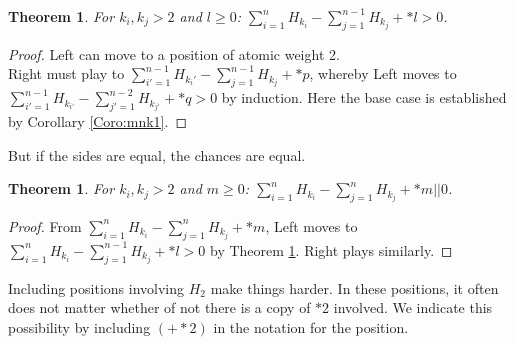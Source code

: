 \documentclass{amsart}
\newcommand{\ds}{\displaystyle}
\newtheorem{theorem}[definition]{Theorem}
\begin{document}
\begin{theorem}
\label{Thm:oneupandstar}
For $k_i,k_j>2$ and $l\geq 0$:
$\ds \sum_{i=1}^n H_{k_i}-\sum_{j=1}^{n-1}H_{k_j}+*l>0$.
\end{theorem}
\begin{proof}
Left can move to a position of atomic weight 2.\\
Right must play to $\ds \sum_{i'=1}^{n-1} H_{k_i'}-\sum_{j=1}^{n-1}H_{k_j}+*p$, whereby Left moves to $\ds \sum_{i'=1}^{n-1} H_{k_{i'}}-\sum_{j'=1}^{n-2}H_{k_{j'}}+*q>0$ by induction.  Here the base case is established by Corollary \ref{Coro:mnk1}.
\end{proof}

But if the sides are equal, the chances are equal.

\begin{theorem}
\label{Theorem:Equal}
 For $k_i,k_j>2$ and $m\geq 0$: $\ds \sum_{i=1}^n H_{k_i}-\sum_{j=1}^n H_{k_j}+*m||0$.

\end{theorem}
\begin{proof}
 From $\ds \sum_{i=1}^n H_{k_i}-\sum_{j=1}^n H_{k_j}+*m$, Left moves to $\ds \sum_{i=1}^n H_{k_i}-\sum_{j=1}^{n-1}H_{k_j}+*l>0$ by Theorem \ref{Thm:oneupandstar}. Right plays similarly.

\end{proof}



Including positions involving $H_2$ make things harder.  In these positions, it often does not matter whether of not there is a copy of $*2$ involved.  We indicate this possibility by including $(+*2)$ in the notation for the position.
\end{document}
